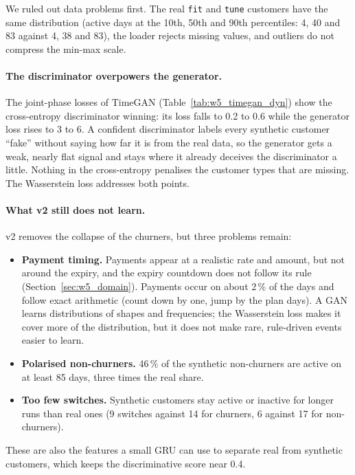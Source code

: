 \documentclass{article}
\begin{document}
We ruled out data problems first. The real \texttt{fit} and \texttt{tune} customers have the same distribution (active days at the 10th, 50th and 90th percentiles: 4, 40 and 83 against 4, 38 and 83), the loader rejects missing values, and outliers do not compress the min-max scale.

\paragraph{The discriminator overpowers the generator.} The joint-phase losses of TimeGAN (Table~\ref{tab:w5_timegan_dyn}) show the cross-entropy discriminator winning: its loss falls to 0.2 to 0.6 while the generator loss rises to 3 to 6. A confident discriminator labels every synthetic customer ``fake'' without saying how far it is from the real data, so the generator gets a weak, nearly flat signal and stays where it already deceives the discriminator a little. Nothing in the cross-entropy penalises the customer types that are missing. The Wasserstein loss addresses both points.

\paragraph{What v2 still does not learn.} v2 removes the collapse of the churners, but three problems remain:
\begin{itemize}
    \item \textbf{Payment timing.} Payments appear at a realistic rate and amount, but not around the expiry, and the expiry countdown does not follow its rule (Section~\ref{sec:w5_domain}). Payments occur on about 2\,\% of the days and follow exact arithmetic (count down by one, jump by the plan days). A GAN learns distributions of shapes and frequencies; the Wasserstein loss makes it cover more of the distribution, but it does not make rare, rule-driven events easier to learn.
    \item \textbf{Polarised non-churners.} 46\,\% of the synthetic non-churners are active on at least 85 days, three times the real share.
    \item \textbf{Too few switches.} Synthetic customers stay active or inactive for longer runs than real ones (9 switches against 14 for churners, 6 against 17 for non-churners).
\end{itemize}
These are also the features a small GRU can use to separate real from synthetic customers, which keeps the discriminative score near 0.4.

\end{document}
